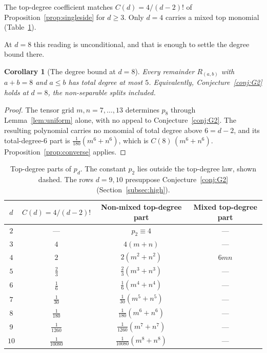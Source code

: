 \documentclass[11pt]{article}
\newtheorem{corollary}[theorem]{Corollary}
\theoremstyle{definition}
\theoremstyle{remark}
\begin{document}
\noindent The top-degree coefficient matches $C(d)=4/(d-2)!$ of
Proposition~\ref{prop:singleside} for $d\ge3$. Only $d=4$ carries a mixed
top monomial (Table~\ref{tab:topdeg}).

At $d=8$ this reading is unconditional, and that is enough to settle the degree
bound there.

\begin{corollary}[The degree bound at $d=8$]\label{cor:G2d8}
Every remainder $R_{(a,b)}$ with $a+b=8$ and $a\le b$ has total degree at most
$5$. Equivalently, Conjecture~\ref{conj:G2} holds at $d=8$, the non-separable
splits included.
\end{corollary}

\begin{proof}
The tensor grid $m,n=7,\dots,13$ determines $p_8$ through
Lemma~\ref{lem:uniform} alone, with no appeal to Conjecture~\ref{conj:G2}. The
resulting polynomial carries no monomial of total degree above $6=d-2$, and its
total-degree-$6$ part is $\tfrac{1}{180}(m^6+n^6)$, which is $C(8)\,(m^6+n^6)$.
Proposition~\ref{prop:converse} applies.
\end{proof}

\begin{table}[!ht]
\centering
\begin{tabular}{@{}cccc@{}}
\toprule
$d$ & $C(d)=4/(d-2)!$ & Non-mixed top-degree part & Mixed top-degree part \\
\midrule
$2$ & ---              & $p_2\equiv 4$                & ---   \\
$3$ & $4$              & $4(m+n)$                    & ---   \\
$4$ & $2$              & $2(m^2+n^2)$                & $6mn$ \\
$5$ & $\tfrac{2}{3}$   & $\tfrac{2}{3}(m^3+n^3)$     & ---   \\
$6$ & $\tfrac{1}{6}$   & $\tfrac{1}{6}(m^4+n^4)$     & ---   \\
$7$ & $\tfrac{1}{30}$  & $\tfrac{1}{30}(m^5+n^5)$    & ---   \\
$8$  & $\tfrac{1}{180}$   & $\tfrac{1}{180}(m^6+n^6)$   & ---   \\
$9$  & $\tfrac{1}{1260}$  & $\tfrac{1}{1260}(m^7+n^7)$  & ---   \\
$10$ & $\tfrac{1}{10080}$ & $\tfrac{1}{10080}(m^8+n^8)$ & ---   \\
\bottomrule
\end{tabular}
\caption{Top-degree parts of $p_d$. The constant $p_2$ lies outside the
top-degree law, shown dashed. The rows $d=9,10$ presuppose
Conjecture~\ref{conj:G2} (Section~\ref{subsec:high}).}
\label{tab:topdeg}
\end{table}
\end{document}
